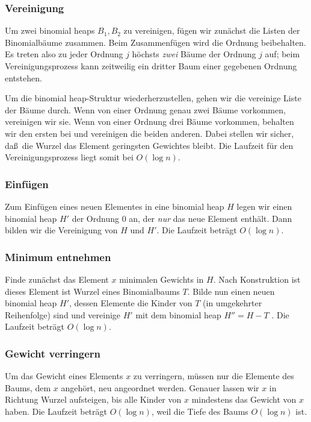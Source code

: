 \documentclass[10pt,reqno]{amsart}
\numberwithin{equation}{section}
\begin{document}
\subsubsection{Vereinigung}

Um zwei binomial heaps $B_1,B_2$ zu vereinigen, f\"ugen wir zun\"achst die Listen der Binomialb\"aume zusammen.
Beim Zusammenf\"ugen wird die Ordnung beibehalten.
Es treten also zu jeder Ordnung $j$ h\"ochsts {\em zwei} B\"aume der Ordnung $j$ auf; beim Vereinigungsprozess kann zeitweilig ein dritter Baum einer gegebenen Ordnung entstehen.

Um die binomial heap-Struktur wiederherzustellen,  gehen wir die vereinige Liste der B\"aume durch.
Wenn von einer Ordnung genau zwei B\"aume vorkommen, vereinigen wir sie.
Wenn von einer Ordnung drei B\"aume vorkommen, behalten wir den ersten bei und vereinigen die beiden anderen.
Dabei stellen wir sicher, da\ss\ die Wurzel das Element geringsten Gewichtes bleibt.
Die Laufzeit f\"ur den Vereinigungsprozess liegt somit bei $O(\log n)$.

\subsubsection{Einf\"ugen}
Zum Einf\"ugen eines neuen Elementes in eine binomial heap $H$ legen wir einen binomial heap $H'$ der Ordnung $0$ an, der \emph{nur} das neue Element enth\"alt.
Dann bilden wir die Vereinigung von $H$ und $H'$.
Die Laufzeit betr\"agt $O(\log n)$.

\subsubsection{Minimum entnehmen}

Finde zun\"achst das Element $x$ minimalen Gewichts in $H$.
Nach Konstruktion ist dieses Element ist Wurzel eines Binomialbaums $T$.
Bilde nun einen neuen binomial heap $H'$, dessen Elemente die Kinder von $T$ (in umgekehrter Reihenfolge) sind und vereinige $H'$ mit dem binomial heap $H''=H-T$ .
Die Laufzeit betr\"agt $O(\log n)$.

\subsubsection{Gewicht verringern}

Um das Gewicht eines Elements $x$ zu verringern, m\"ussen nur die Elemente des Baums, dem $x$ angeh\"ort, neu angeordnet werden.
Genauer lassen wir $x$ in Richtung Wurzel aufsteigen, bis alle Kinder von $x$ mindestens das Gewicht von $x$ haben.
Die Laufzeit betr\"agt $O(\log n)$, weil die Tiefe des Baums $O(\log n)$ ist.
\end{document}
